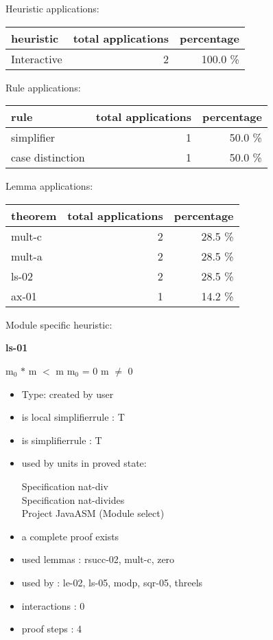 \documentclass[a4paper]{article}
\begin{document}
\medskip


Heuristic applications:

\begin{supertabular}{l|r|r}
heuristic	& total applications & percentage \\ \hline
Interactive & 2 & 100.0 \% \\

\end{supertabular}

Rule applications:

\begin{supertabular}{l|r|r}
rule	        & total applications & percentage \\ \hline
simplifier & 1 & 50.0 \% \\
case distinction & 1 & 50.0 \% \\

\end{supertabular}

Lemma applications:

\begin{supertabular}{l|r|r}
theorem	        & total applications & percentage \\ \hline
mult-c & 2 & 28.5 \% \\
mult-a & 2 & 28.5 \% \\
ls-02 & 2 & 28.5 \% \\
ax-01 & 1 & 14.2 \% \\

\end{supertabular}

Module specific heuristic:

\pagebreak

{\LARGE\bf ls-01}\label{lemma-ls-01}

\medskip

 \Fol $\mbox{m}_{0}$ $*$ m $<$ m \Equiv $\mbox{m}_{0}$ = 0 \And m $\neq$ 0

\begin{itemize}

\item Type: created by user

\item is local simplifierrule : T
\item is simplifierrule : T
\item used by units in proved state:

Specification nat-div \\
Specification nat-divides \\
Project JavaASM (Module select)
\item       a complete proof exists
\item       used lemmas  : rsucc-02, mult-c, zero
\item       used by      : le-02, ls-05, modp, sqr-05, threels
\item       interactions : 0
\item       proof steps  : 4
\end{itemize}
\end{document}
